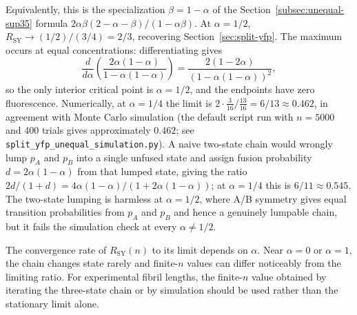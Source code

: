 \documentclass[11pt]{article}
\begin{document}
Equivalently, this is the specialization $\beta = 1 - \alpha$ of the Section~\ref{subsec:unequal-sup35} formula $2\alpha\beta(2-\alpha-\beta)/(1-\alpha\beta)$. At $\alpha = 1/2$, $R_{\text{SY}} \to (1/2)/(3/4) = 2/3$, recovering Section~\ref{sec:split-yfp}. The maximum occurs at equal concentrations: differentiating gives
\[
\frac{d}{d\alpha}\left(\frac{2\alpha(1-\alpha)}{1-\alpha(1-\alpha)}\right)
= \frac{2(1-2\alpha)}{(1-\alpha(1-\alpha))^2},
\]
so the only interior critical point is $\alpha=1/2$, and the endpoints have zero fluorescence. Numerically, at $\alpha = 1/4$ the limit is $2 \cdot \tfrac{3}{16} / \tfrac{13}{16} = 6/13 \approx 0.462$, in agreement with Monte Carlo simulation (the default script run with $n=5000$ and 400 trials gives approximately $0.462$; see \texttt{split\_yfp\_unequal\_simulation.py}). A naive two-state chain would wrongly lump $p_A$ and $p_B$ into a single unfused state and assign fusion probability $d=2\alpha(1-\alpha)$ from that lumped state, giving the ratio $2d/(1+d)=4\alpha(1-\alpha)/(1+2\alpha(1-\alpha))$; at $\alpha = 1/4$ this is $6/11 \approx 0.545$. The two-state lumping is harmless at $\alpha=1/2$, where A/B symmetry gives equal transition probabilities from $p_A$ and $p_B$ and hence a genuinely lumpable chain, but it fails the simulation check at every $\alpha \neq 1/2$.

The convergence rate of $R_{\text{SY}}(n)$ to its limit depends on $\alpha$. Near $\alpha=0$ or $\alpha=1$, the chain changes state rarely and finite-$n$ values can differ noticeably from the limiting ratio. For experimental fibril lengths, the finite-$n$ value obtained by iterating the three-state chain or by simulation should be used rather than the stationary limit alone.
\end{document}
